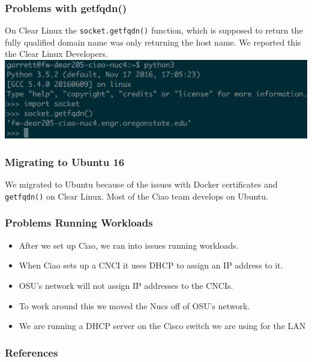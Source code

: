 \documentclass[pdf]{beamer}
\begin{document}
\begin{frame}
	\frametitle{Problems with getfqdn()}
	On Clear Linux the \texttt{socket.getfqdn()} function, which is supposed to return the fully qualified domain name was only returning the host name. We reported this the Clear Linux Developers.
	\includegraphics[scale=0.5]{getfqdn.eps}
\end{frame}

\begin{frame}
	\frametitle{Migrating to Ubuntu 16}
	We migrated to Ubuntu because of the issues with Docker certificates and \texttt{getfqdn()} on Clear Linux. Most of the Ciao team develops on Ubuntu.
\end{frame}

\begin{frame}
	\frametitle{Problems Running Workloads}
	\begin{itemize}
		\item After we set up Ciao, we ran into issues running workloads.
		\item When Ciao sets up a CNCI it uses DHCP to assign an IP address to it.
		\item OSU's network will not assign IP addresses to the CNCIs.
		\item To work around this we moved the Nucs off of OSU's network.
		\item We are running a DHCP server on the Cisco switch we are using for the LAN
	\end{itemize}
\end{frame} 


\begin{frame}
	\frametitle{References}
		
		
	\end{frame}
\end{document}
